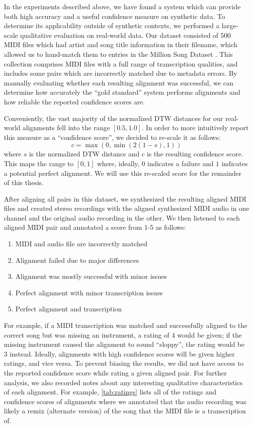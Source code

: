 In the experiments described above, we have found a system which can provide both high accuracy and a useful confidence measure on synthetic data.
To determine its applicability outside of synthetic contexts, we performed a large-scale qualitative evaluation on real-world data.
Our dataset consisted of 500 MIDI files which had artist and song title information in their filename, which allowed us to hand-match them to entries in the Million Song Dataset \cite{bertin2011million}.
This collection comprises MIDI files with a full range of transcription qualities, and includes some pairs which are incorrectly matched due to metadata errors.
By manually evaluating whether each resulting alignment was successful, we can determine how accurately the ``gold standard'' system performs alignments and how reliable the reported confidence scores are.

Conveniently, the vast majority of the normalized DTW distances for our real-world alignments fell into the range $[0.5, 1.0]$.
In order to more intuitively report this measure as a ``confidence score'', we decided to re-scale it as follows:
\begin{equation}
        c = \max(0, \min(2(1 - s), 1))
        \label{eq:score_normalization}
\end{equation}
where $s$ is the normalized DTW distance and $c$ is the resulting confidence score.
This maps the range to $[0, 1]$ where, ideally, $0$ indicates a failure and $1$ indicates a potential perfect alignment.
We will use this re-scaled score for the remainder of this thesis.

After aligning all pairs in this dataset, we synthesized the resulting aligned MIDI files and created stereo recordings with the aligned synthesized MIDI audio in one channel and the original audio recording in the other.
We then listened to each aligned MIDI pair and annotated a score from 1-5 as follows:
\begin{enumerate}
\item MIDI and audio file are incorrectly matched
\item Alignment failed due to major differences
\item Alignment was mostly successful with minor issues
\item Perfect alignment with minor transcription issues
\item Perfect alignment and transcription
\end{enumerate}
For example, if a MIDI transcription was matched and successfully aligned to the correct song but was missing an instrument, a rating of 4 would be given; if the missing instrument caused the alignment to sound ``sloppy'', the rating would be 3 instead.
Ideally, alignments with high confidence scores will be given higher ratings, and vice versa.
To prevent biasing the results, we did not have access to the reported confidence score while rating a given aligned pair.
For further analysis, we also recorded notes about any interesting qualitative characteristics of each alignment.
For example, \cref{tab:ratings} lists all of the ratings and confidence scores of alignments where we annotated that the audio recording was likely a remix (alternate version) of the song that the MIDI file is a transcription of.

